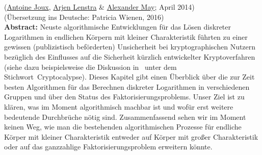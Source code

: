 \begin{refsegment}
\label{Chapter_Dlog-FactoringDead}

(\hyperlink{author_Antoine-Joux}{Antoine Joux}, \hyperlink{author_Arjen-Lenstra}{Arjen Lenstra} \& \hyperlink{author_Alexander-May}{Alexander May}; April 2014)\\

\noindent (Übersetzung ins Deutsche: Patricia Wienen, 2016)\\



\noindent \textbf{Abstract:}
Neuste algorithmische Entwicklungen für das Lösen diskreter Logarithmen in endlichen
Körpern mit kleiner Charakteristik führten zu einer gewissen (publizistisch beförderten)
Unsicherheit bei kryptographischen Nutzern bezüglich des Einflusses auf die Sicherheit kürzlich entwickelter Kryptoverfahren (siehe dazu beispielsweise die Diskussion in~\cite{Blackhat2013} unter dem Stichwort~\glqq Cryptocalypse\grqq).   Dieses Kapitel gibt einen Überblick über die zur Zeit besten Algorithmen für das Berechnen diskreter Logarithmen in verschiedenen Gruppen und über den Status des Faktorisierungsproblems. Unser Ziel ist zu klären, was im Moment algorithmisch machbar ist und wofür erst weitere bedeutende Durchbrüche nötig sind. Zusammenfassend sehen wir im Moment keinen Weg, wie man die bestehenden algorithmischen Prozesse für endliche Körper mit kleiner Charakteristik entweder auf Körper mit großer Charakteristik oder auf das ganzzahlige Faktorisierungsproblem erweitern könnte.



\end{refsegment}
